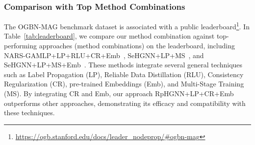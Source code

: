 \documentclass[lettersize,journal]{IEEEtran}
\begin{document}
\begin{table}[!tp]
\vspace{-2mm}
\centering
\caption{
Performance on OGBN-MAG leaderboard.
}
\label{tab:leaderboard}
\end{table}







\subsubsection{Comparison with Top Method Combinations}\label{sec:leaderboard}

The OGBN-MAG benchmark dataset is associated with a public leaderboard\footnote{\url{https://ogb.stanford.edu/docs/leader_nodeprop/\#ogbn-mag}}.
In Table~\ref{tab:leaderboard}, we compare our method combination against top-performing approaches (method combinations) on the leaderboard, including NARS-GAMLP+LP+RLU+CR+Emb~\cite{DBLP:journals/corr/abs-2112-04319,DBLP:conf/kdd/ZhangYS0OLT0022}, SeHGNN+LP+MS~\cite{yang2022simple}, and SeHGNN+LP+MS+Emb~\cite{yang2022simple}.
These methods integrate several general techniques such as Label Propagation (LP), Reliable Data Distillation (RLU), Consistency Regularization (CR), pre-trained Embeddings (Emb), and Multi-Stage Training (MS). 
By integrating CR and Emb, our approach RpHGNN+LP+CR+Emb outperforms other approaches, demonstrating its efficacy and compatibility with these techniques.
\end{document}
